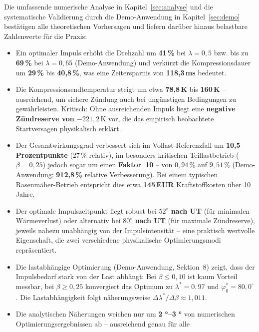 ﻿\documentclass[a4paper,12pt]{article}
\begin{document}
Die umfassende numerische Analyse in Kapitel~\ref{sec:analyse} und die
systematische Validierung durch die Demo-Anwendung in Kapitel~\ref{sec:demo}
bestätigen alle theoretischen Vorhersagen und liefern darüber hinaus
belastbare Zahlenwerte für die Praxis:

\begin{itemize}
  \item Ein optimaler Impuls erhöht die Drehzahl um \textbf{41\,\%} bei
    $\lambda = 0{,}5$ bzw. bis zu \textbf{69\,\%} bei $\lambda = 0{,}65$
    (Demo-Anwendung) und verkürzt die Kompressionsdauer um \textbf{29\,\%}
    bis \textbf{40{,}8\,\%}, was eine Zeitersparnis von \textbf{118{,}3\,ms}
    bedeutet.
  \item Die Kompressionsendtemperatur steigt um etwa \textbf{78{,}8\,K} bis
    \textbf{160\,K} -- ausreichend, um sichere Zündung auch bei ungünstigen
    Bedingungen zu gewährleisten. Kritisch: Ohne ausreichenden Impuls liegt
    eine \textbf{negative Zündreserve von $-221{,}2\,\text{K}$} vor, die
    das empirisch beobachtete Startversagen physikalisch erklärt.
  \item Der Gesamtwirkungsgrad verbessert sich im Vollast-Referenzfall
    um \textbf{10{,}5 Prozentpunkte} (27\,\% relativ), im besonders
    kritischen Teillastbetrieb ($\beta = 0{,}25$) jedoch sogar um einen
    \textbf{Faktor~10} -- von $0{,}94\,\%$ auf $9{,}51\,\%$ (Demo-Anwendung:
    \textbf{912{,}8\,\%} relative Verbesserung). Bei einem typischen
    Rasenmäher-Betrieb entspricht dies etwa \textbf{145\,EUR} Kraftstoffkosten
    über 10 Jahre.
  \item Der optimale Impulszeitpunkt liegt robust bei \textbf{$52^\circ$ nach UT}
    (für minimalen Wärmeverlust) oder alternativ bei \textbf{$80^\circ$ nach UT}
    (für maximale Zündreserve), jeweils nahezu unabhängig von der Impulsintensität
    -- eine praktisch wertvolle Eigenschaft, die zwei verschiedene physikalische
    Optimierungsmodi repräsentiert.
  \item Die lastabhängige Optimierung (Demo-Anwendung, Sektion~8) zeigt,
    dass der Impulsbedarf stark von der Last abhängt: Bei $\beta \leq 0{,}10$
    ist kaum Vorteil messbar, bei $\beta \geq 0{,}25$ konvergiert das
    Optimum zu $\lambda^* = 0{,}97$ und $\varphi_0^* = 80{,}0^\circ$.
    Die Lastabhängigkeit folgt näherungsweise $\Delta\lambda^*/\Delta\beta \approx 1{,}011$.
  \item Die analytischen Näherungen weichen nur um \textbf{2 °--3 °} von
    numerischen Optimierungsergebnissen ab -- ausreichend genau für alle

\end{itemize}
\end{document}
